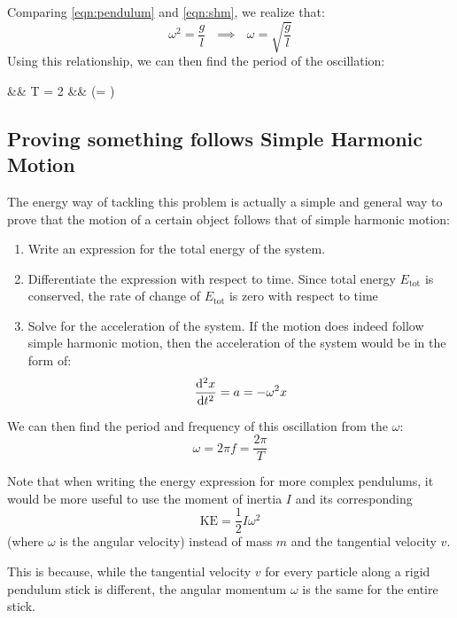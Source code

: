 \documentclass[11pt]{article}
\begin{document}
	Comparing \eqref{eqn:pendulum} and \eqref{eqn:shm}, we realize that:
	\begin{equation*}
	\omega^2 = \frac{g}{l} ~~~\implies ~~~ \omega = \sqrt{\frac{g}{l}}
	\end{equation*}
	Using this relationship, we can then find the period of the oscillation:
	\begin{flalign*}
	&& T = 2\pi {} && \left(\omega = \right)
	\end{flalign*}
	
	\subsection*{Proving something follows Simple Harmonic Motion}
	The energy way of tackling this problem is actually a simple and  general way to prove that the motion of a certain object follows that of simple harmonic motion:
	\begin{enumerate}
		\item Write an expression for the total energy of the system.
		\item Differentiate the expression with respect to time. Since total energy $E_{\text{tot}}$ is conserved, the rate of change of $E_{\text{tot}}$ is zero with respect to time
		\item Solve for the acceleration of the system. If the motion does indeed follow simple harmonic motion, then the acceleration of the system would be in the form of:
		\begin{equation*}
		\dod[2]{x}{t} = a =-\omega^2x
		\end{equation*}
	\end{enumerate}
	We can then find the period and frequency of this oscillation from the $\omega$: 
	\begin{equation*}
	\omega = 2\pi f = \frac{2\pi}{T}
	\end{equation*}
	
	Note that when writing the energy expression for more complex pendulums, it would be more useful to use the moment of inertia $I$ and its corresponding $$\text{KE} = \frac{1}{2} I \omega^2$$ (where $\omega$ is the angular velocity) instead of mass $m$ and the tangential velocity $v$. 
	
	This is because, while the tangential velocity $v$ for every particle along a rigid pendulum stick is different, the angular momentum $\omega$ is the same for the entire stick.
\end{document}
